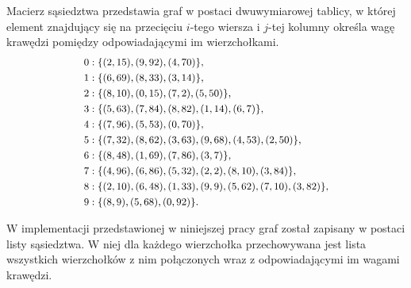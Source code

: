 \noindent
Macierz sąsiedztwa przedstawia graf w postaci dwuwymiarowej tablicy, w której element znajdujący się na przecięciu \(i\)-tego wiersza i \(j\)-tej kolumny określa wagę krawędzi pomiędzy odpowiadającymi im wierzchołkami.
\begin{equation}
\label{eq:adjacency_list}
\small
\begin{aligned}
0 &: \{(2,15), (9,92), (4,70)\}, \\
1 &: \{(6,69), (8,33), (3,14)\}, \\
2 &: \{(8,10), (0,15), (7,2), (5,50)\}, \\
3 &: \{(5,63), (7,84), (8,82), (1,14), (6,7)\}, \\
4 &: \{(7,96), (5,53), (0,70)\}, \\
5 &: \{(7,32), (8,62), (3,63), (9,68), (4,53), (2,50)\}, \\
6 &: \{(8,48), (1,69), (7,86), (3,7)\}, \\
7 &: \{(4,96), (6,86), (5,32), (2,2), (8,10), (3,84)\}, \\
8 &: \{(2,10), (6,48), (1,33), (9,9), (5,62), (7,10), (3,82)\}, \\
9 &: \{(8,9), (5,68), (0,92)\}.
\end{aligned}
\end{equation}

\noindent
W implementacji przedstawionej w niniejszej pracy graf został zapisany w postaci listy sąsiedztwa. W niej dla każdego wierzchołka przechowywana jest lista wszystkich wierzchołków z nim połączonych wraz z odpowiadającymi im wagami krawędzi.
